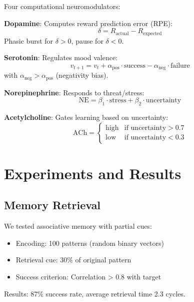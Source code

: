 \documentclass[twocolumn,10pt]{article}
\begin{document}
Four computational neuromodulators:

\textbf{Dopamine}: Computes reward prediction error (RPE):
\begin{equation}
\delta = R_{\text{actual}} - R_{\text{expected}}
\end{equation}
Phasic burst for $\delta > 0$, pause for $\delta < 0$.

\textbf{Serotonin}: Regulates mood valence:
\begin{equation}
v_{t+1} = v_t + \alpha_{\text{pos}} \cdot \text{success} - \alpha_{\text{neg}} \cdot \text{failure}
\end{equation}
with $\alpha_{\text{neg}} > \alpha_{\text{pos}}$ (negativity bias).

\textbf{Norepinephrine}: Responds to threat/stress:
\begin{equation}
\text{NE} = \beta_1 \cdot \text{stress} + \beta_2 \cdot \text{uncertainty}
\end{equation}

\textbf{Acetylcholine}: Gates learning based on uncertainty:
\begin{equation}
\text{ACh} = 
\begin{cases}
\text{high} & \text{if uncertainty} > 0.7 \\
\text{low} & \text{if uncertainty} < 0.3
\end{cases}
\end{equation}

\section{Experiments and Results}

\subsection{Memory Retrieval}

We tested associative memory with partial cues:
\begin{itemize}
    \item Encoding: 100 patterns (random binary vectors)
    \item Retrieval cue: 30\% of original pattern
    \item Success criterion: Correlation > 0.8 with target
\end{itemize}

Results: 87\% success rate, average retrieval time 2.3 cycles.
\end{document}
